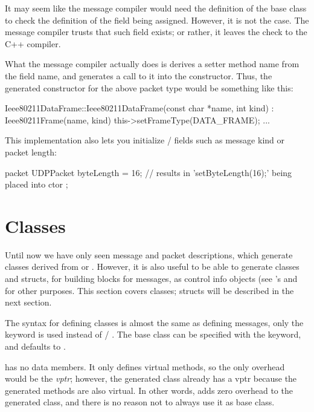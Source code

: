 It may seem like the message compiler would need the definition of the base
class to check the definition of the field being assigned. However, it is
not the case. The message compiler trusts that such field exists; or
rather, it leaves the check to the C++ compiler.

What the message compiler actually does is derives a setter method name
from the field name, and generates a call to it into the constructor.
Thus, the generated constructor for the above packet type would be
something like this:

\begin{cpp}
Ieee80211DataFrame::Ieee80211DataFrame(const char *name, int kind) :
    Ieee80211Frame(name, kind)
{
    this->setFrameType(DATA_FRAME);
    ...
}
\end{cpp}

This implementation also lets you initialize  /
 fields such as message kind or packet length:

\begin{msg}
packet UDPPacket
{
    byteLength = 16;  // results in 'setByteLength(16);' being placed into ctor
};
\end{msg}



\section{Classes}
\label{sec:ch-msg-defs:defining-classes}

Until now we have only seen message and packet descriptions, which generate
classes derived from  or . However, it is
also useful to be able to generate classes and structs, for building blocks
for messages, as control info objects (see 's
 and for other purposes. This section covers
classes; structs will be described in the next section.

The syntax for defining classes is almost the same as defining messages,
only the  keyword is used instead of  /
. The base class can be specified with the 
keyword, and defaults to .

\begin{note}
 has no data members. It only defines virtual methods, so
the only overhead would be the \textit{vptr}; however, the generated class already has
a vptr because the generated methods are also virtual. In other words,
 adds zero overhead to the generated class, and there is no
reason not to always use it as base class.
\end{note}

